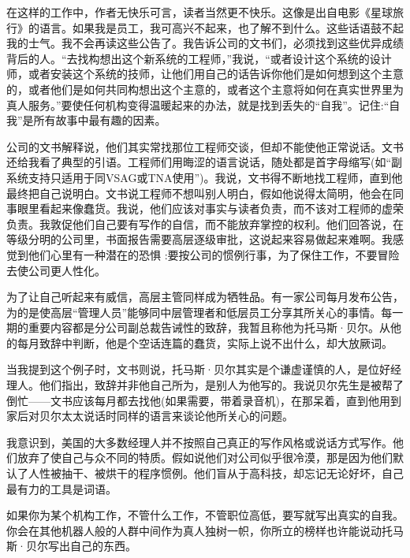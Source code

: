 在这样的工作中，作者无快乐可言，读者当然更不快乐。这像是出自电影《星球旅行》的语言。如果我是员工，我可高兴不起来，也了解不到什么。这些话语鼓不起我的士气。我不会再读这些公告了。我告诉公司的文书们，必须找到这些优异成绩背后的人。“去找构想出这个新系统的工程师，”我说，“或者设计这个系统的设计师，或者安装这个系统的技师，让他们用自己的话告诉你他们是如何想到这个主意的，或者他们是如何共同构想出这个主意的，或者这个主意将如何在真实世界里为真人服务。”要使任何机构变得温暖起来的办法，就是找到丢失的“自我”。记住:“自我”是所有故事中最有趣的因素。

公司的文书解释说，他们其实常找那位工程师交谈，但却不能使他正常说话。文书还给我看了典型的引语。工程师们用晦涩的语言说话，随处都是首字母缩写(如“副系统支持只适用于同VSAG或TNA使用”)。我说，文书得不断地找工程师，直到他最终把自己说明白。文书说工程师不想叫别人明白，假如他说得太简明，他会在同事眼里看起来像蠢货。我说，他们应该对事实与读者负责，而不该对工程师的虚荣负责。我敦促他们自己要有写作的自信，而不能放弃掌控的权利。他们回答说，在等级分明的公司里，书面报告需要高层逐级审批，这说起来容易做起来难啊。我感觉到他们心里有一种潜在的恐惧 :要按公司的惯例行事，为了保住工作，不要冒险去使公司更人性化。

为了让自己听起来有威信，高层主管同样成为牺牲品。有一家公司每月发布公告，为的是使高层“管理人员”能够同中层管理者和低层员工分享其所关心的事情。每一期的重要内容都是分公司副总裁告诫性的致辞，我暂且称他为托马斯·贝尔。从他的每月致辞中判断，他是个空话连篇的蠢货，实际上说不出什么，却大放厥词。

当我提到这个例子时，文书则说，托马斯·贝尔其实是个谦虚谨慎的人，是位好经理人。他们指出，致辞并非他自己所为，是别人为他写的。我说贝尔先生是被帮了倒忙——文书应该每月都去找他(如果需要，带着录音机)，在那呆着，直到他用到家后对贝尔太太说话时同样的语言来谈论他所关心的问题。

我意识到，美国的大多数经理人并不按照自己真正的写作风格或说话方式写作。他们放弃了使自己与众不同的特质。假如说他们对公司似乎很冷漠，那是因为他们默认了人性被抽干、被烘干的程序惯例。他们盲从于高科技，却忘记无论好坏，自己最有力的工具是词语。

如果你为某个机构工作，不管什么工作，不管职位高低，要写就写出真实的自我。你会在其他机器人般的人群中间作为真人独树一帜，你所立的榜样也许能说动托马斯·贝尔写出自己的东西。
